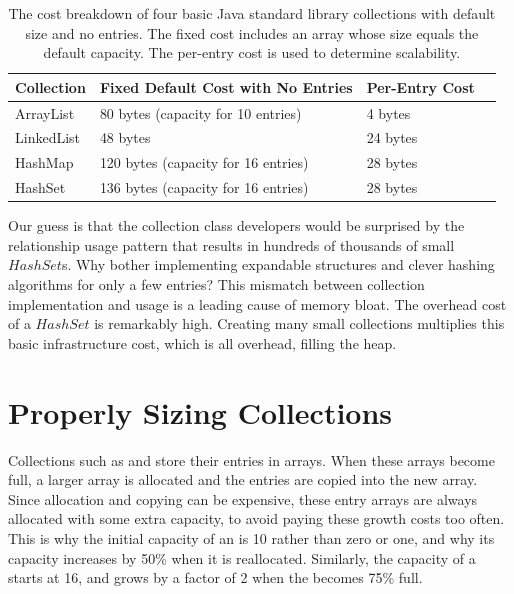 \begin{table}
  \centering
 \begin{tabular}{llll} \toprule
 	 Collection & Fixed Default Cost with No Entries & Per-Entry Cost  \\ \midrule
 	ArrayList & 80 bytes (capacity for 10 entries) & 4 bytes  \\
 	LinkedList & 48 bytes & 24 bytes  \\
 	HashMap & 120 bytes (capacity for 16 entries) & 28 bytes  \\
 	HashSet & 136 bytes (capacity for 16 entries) & 28 bytes &  \\
 	\bottomrule
 \end{tabular}
  \caption{The cost breakdown of four basic Java standard library collections
  with default size and no entries. The fixed cost includes an array whose
   size equals the default capacity. The per-entry cost is used to
  determine scalability.}
  \label{tab:collection-costs}
\end{table}

Our guess is that the
collection class developers would be surprised by the relationship usage pattern
that results in hundreds of thousands of small $HashSet$s. Why bother
implementing expandable structures and clever hashing algorithms for only a few entries?
This mismatch between collection implementation and usage is 
a leading cause of memory bloat. The overhead cost of a $HashSet$ is remarkably
high. Creating many small collections multiplies this basic infrastructure
cost, which is all overhead, filling the heap. 
 

\section{Properly Sizing Collections}
\label{sec:proper-size}

Collections such as  and  store their entries in
arrays. When these arrays become full, a larger array is allocated
and the entries are copied into the new array.  Since allocation and copying
can be expensive, these entry arrays are always allocated with some extra
capacity, to avoid paying these growth costs too often. 
This is why the initial capacity of an  is 10 rather than zero
 or one, and why its capacity increases by
50\% when it is reallocated. 
Similarly, the capacity of a  starts at 16, and grows by a
factor of 2 when the  becomes 75\% full. 

